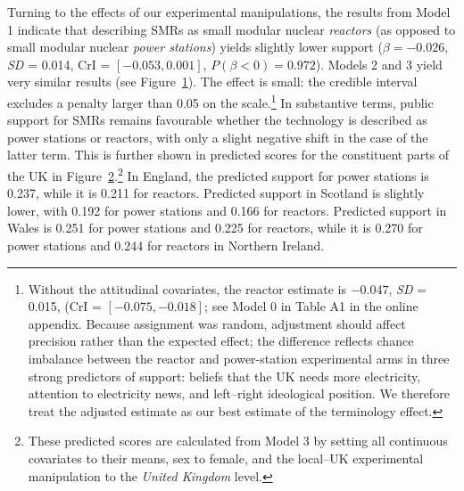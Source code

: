 \documentclass[a4paper, 11pt]{article}
\begin{document}
Turning to the effects of our experimental manipulations, the results from Model 1 indicate that describing SMRs as small modular nuclear \emph{reactors} (as opposed to small modular nuclear \emph{power stations}) yields slightly lower support ($\beta = -0.026$, \emph{SD} = 0.014, CrI = $[-0.053, 0.001]$, $P(\beta < 0) = 0.972$). Models 2 and 3 yield very similar results (see Figure~\ref{fig:coefplot}). The effect is small: the credible interval excludes a penalty larger than 0.05 on the scale.\footnote{Without the attitudinal covariates, the reactor estimate is $-0.047$, \emph{SD} = 0.015, (CrI = $[-0.075, -0.018]$; see Model 0 in Table A1 in the online appendix. Because assignment was random, adjustment should affect precision rather than the expected effect; the difference reflects chance imbalance between the reactor and power-station experimental arms in three strong predictors of support: beliefs that the UK needs more electricity, attention to electricity news, and left--right ideological position. We therefore treat the adjusted estimate as our best estimate of the terminology effect.} In substantive terms, public support for SMRs remains favourable whether the technology is described as power stations or reactors, with only a slight negative shift in the case of the latter term. This is further shown in predicted scores for the constituent parts of the UK in Figure~\ref{fig:pred-frame}.\footnote{These predicted scores are calculated from Model 3 by setting all continuous covariates to their means, sex to female, and the local--UK experimental manipulation to the \emph{United Kingdom} level.} In England, the predicted support for power stations is 0.237, while it is 0.211 for reactors. Predicted support in Scotland is slightly lower, with 0.192 for power stations and 0.166 for reactors. Predicted support in Wales is 0.251 for power stations and 0.225 for reactors, while it is 0.270 for power stations and 0.244 for reactors in Northern Ireland.

\begin{figure}
    \centering
    \label{fig:coefplot}
\end{figure}

\begin{figure}
    \centering
    \label{fig:pred-frame}
\end{figure}
\end{document}

